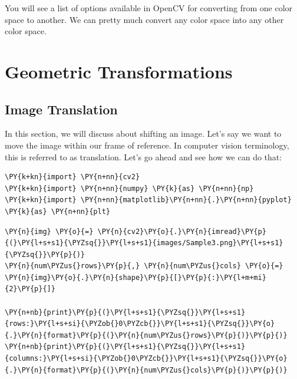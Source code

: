 \vspace{0.5cm}

You will see a list of options available in OpenCV for converting from one color space to another. We can pretty 	much convert any color space into any other color space. 

\section{Geometric Transformations}

\subsection{Image Translation}
In this section, we will discuss about shifting an image. Let's say we want to move the image within our frame of reference. In computer vision terminology, this is referred to as translation. Let's go ahead and see how we can do 	that:

\vspace{0.5cm}

\begin{tcolorbox}[breakable, size=fbox, boxrule=1pt, pad at break*=1mm,colback=cellbackground, colframe=cellborder]
	\begin{Verbatim}[commandchars=\\\{\}]
\PY{k+kn}{import} \PY{n+nn}{cv2}
\PY{k+kn}{import} \PY{n+nn}{numpy} \PY{k}{as} \PY{n+nn}{np}
\PY{k+kn}{import} \PY{n+nn}{matplotlib}\PY{n+nn}{.}\PY{n+nn}{pyplot} \PY{k}{as} \PY{n+nn}{plt}
	\end{Verbatim}
\end{tcolorbox}

\begin{tcolorbox}[breakable, size=fbox, boxrule=1pt, pad at break*=1mm,colback=cellbackground, colframe=cellborder]
	\begin{Verbatim}[commandchars=\\\{\}]
\PY{n}{img} \PY{o}{=} \PY{n}{cv2}\PY{o}{.}\PY{n}{imread}\PY{p}{(}\PY{l+s+s1}{\PYZsq{}}\PY{l+s+s1}{images/Sample3.png}\PY{l+s+s1}{\PYZsq{}}\PY{p}{)}
\PY{n}{num\PYZus{}rows}\PY{p}{,} \PY{n}{num\PYZus{}cols} \PY{o}{=} \PY{n}{img}\PY{o}{.}\PY{n}{shape}\PY{p}{[}\PY{p}{:}\PY{l+m+mi}{2}\PY{p}{]}
		
\PY{n+nb}{print}\PY{p}{(}\PY{l+s+s1}{\PYZsq{}}\PY{l+s+s1}{rows:}\PY{l+s+si}{\PYZob{}0\PYZcb{}}\PY{l+s+s1}{\PYZsq{}}\PY{o}{.}\PY{n}{format}\PY{p}{(}\PY{n}{num\PYZus{}rows}\PY{p}{)}\PY{p}{)}
\PY{n+nb}{print}\PY{p}{(}\PY{l+s+s1}{\PYZsq{}}\PY{l+s+s1}{columns:}\PY{l+s+si}{\PYZob{}0\PYZcb{}}\PY{l+s+s1}{\PYZsq{}}\PY{o}{.}\PY{n}{format}\PY{p}{(}\PY{n}{num\PYZus{}cols}\PY{p}{)}\PY{p}{)}
	\end{Verbatim}
\end{tcolorbox}

